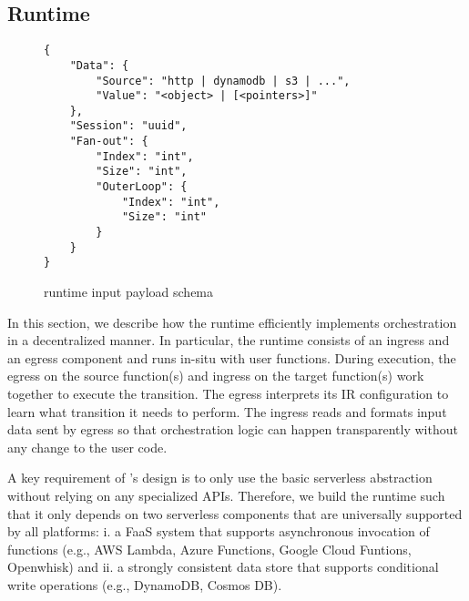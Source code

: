 \subsection{\name{} Runtime}\label{sec:runtime}


\begin{figure}[]
    \begin{verbatim}
{
    "Data": {
        "Source": "http | dynamodb | s3 | ...",
        "Value": "<object> | [<pointers>]"
    },
    "Session": "uuid",
    "Fan-out": {
        "Index": "int",
        "Size": "int",
        "OuterLoop": {
            "Index": "int",
            "Size": "int"
        }
    }
}
    \end{verbatim}
    \caption{\name{} runtime input payload schema}
    \label{fig:input-format}
\end{figure}

In this section, we describe how the \name{} runtime efficiently implements
orchestration in a decentralized manner. In particular, the runtime consists
of an ingress and an egress component and runs in-situ with user functions.
During execution, the egress on the source function(s) and ingress on the
target function(s) work together to execute the transition. The egress
interprets its IR configuration to learn what transition it needs to perform.
The ingress reads and formats input data sent by egress so that
\name{} orchestration logic can happen transparently without any change to the
user code.

A key requirement of \name{}'s design is to only use the basic serverless
abstraction without relying on any specialized APIs. Therefore, we build the
runtime such that it only depends on two serverless components that are
universally supported by all platforms: i. a FaaS system that supports
asynchronous invocation of functions (e.g., AWS Lambda, Azure Functions,
Google Cloud Funtions, Openwhisk) and ii. a strongly consistent data store
that supports conditional write operations (e.g., DynamoDB, Cosmos DB).

